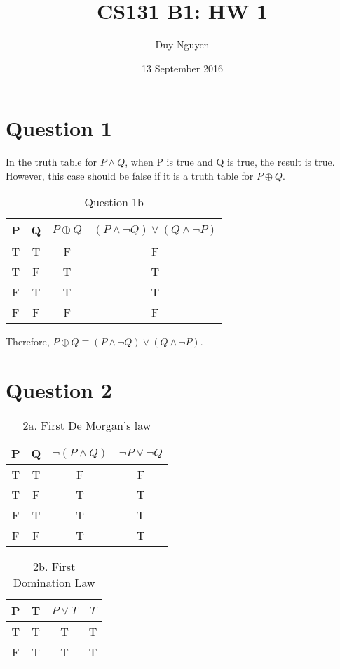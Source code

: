 \documentclass{article}
\title{CS131 B1: HW 1}
\author{Duy Nguyen}
\date{13 September 2016}
\begin{document}
\maketitle

\section*{Question 1}
In the truth table for $P \land Q$, when P is true and Q is true, the result is true. However, this case should be false if it is a truth table for $P \oplus Q$.

\begin{table}[h]
\centering
\caption{Question 1b}
\begin{tabular}{cc|cc}
P & Q & $P \oplus Q$ & $(P \land \neg Q) \lor (Q \land \neg P)$ \\ \hline
T & T & F          & F                                    \\
T & F & T          & T                                    \\
F & T & T          & T                                    \\
F & F & F          & F                                   
\end{tabular}

\end{table}

Therefore, $P \oplus Q \equiv (P \land \neg Q) \lor (Q \land \neg P)$.

\section*{Question 2}
\begin{table}[h]
\centering
\caption{2a. First De Morgan's law}
\begin{tabular}{cc|cc}
P & Q & $\neg (P \land Q)$ & $\neg P \lor \neg Q$ \\ \hline
T & T & F          & F                                    \\
T & F & T          & T                                    \\
F & T & T          & T                                    \\
F & F & T          & T                                   
\end{tabular}

\end{table}

\begin{table}[h]
\centering
\caption{2b. First Domination Law}
\begin{tabular}{cc|cc}
P & T & $P \lor T$ & $T$ \\ \hline
T & T & T          & T                                    \\
F & T & T          & T                                    
\end{tabular}
\end{table}
\end{document}
